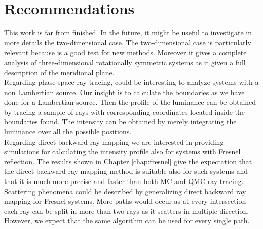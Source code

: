 \section{Recommendations}
This work is far from finished. In the future, it might be useful to investigate in more details the two-dimensional case. The two-dimensional case is particularly relevant because is a good test for new methods. Moreover it gives a complete analysis of three-dimensional rotationally symmetric systems as it given a full description of the meridional plane.\\ \indent 
Regarding phase space ray tracing, could be interesting to analyze systems with a non Lambertian source. Our insight is to calculate the boundaries as we have done for a Lambertian source. Then the profile of the luminance can be obtained by tracing a sample of rays with corresponding coordinates located inside the boundaries found. The intensity can be obtained by merely integrating the luminance over all the possible positions. \\ \indent 
Regarding direct backward ray mapping we are interested in providing simulations for calculating the intensity profile also for systems with Fresnel reflection. The results shown in Chapter \ref{chap:fresnel} give the expectation that the direct backward ray mapping method is suitable also for such systems and that it is much more precise and faster than both MC and QMC ray tracing. Scattering phenomena could be described by generalizing direct backward ray mapping for Fresnel systems. More paths would occur as at every intersection each ray can be split in more than two rays as it scatters in multiple direction. However, we expect that the same algorithm can be used for every single path. 
